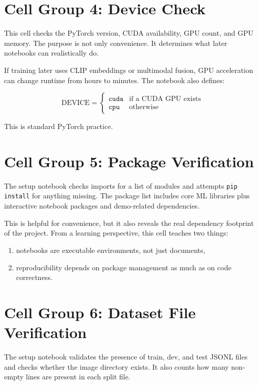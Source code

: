 \documentclass[11pt,a4paper]{report}
\begin{document}
\section{Cell Group 4: Device Check}

This cell checks the PyTorch version, CUDA availability, GPU count, and GPU memory. The purpose is not only convenience. It determines what later notebooks can realistically do.

If training later uses CLIP embeddings or multimodal fusion, GPU acceleration can change runtime from hours to minutes. The notebook also defines:

\[
\text{DEVICE} =
\begin{cases}
\texttt{cuda} & \text{if a CUDA GPU exists} \\
\texttt{cpu} & \text{otherwise}
\end{cases}
\]

This is standard PyTorch practice.

\section{Cell Group 5: Package Verification}

The setup notebook checks imports for a list of modules and attempts \texttt{pip install} for anything missing. The package list includes core ML libraries plus interactive notebook packages and demo-related dependencies.

This is helpful for convenience, but it also reveals the real dependency footprint of the project. From a learning perspective, this cell teaches two things:

\begin{enumerate}[label=\arabic*.]
\item notebooks are executable environments, not just documents,
\item reproducibility depends on package management as much as on code correctness.
\end{enumerate}

\section{Cell Group 6: Dataset File Verification}

The setup notebook validates the presence of train, dev, and test JSONL files and checks whether the image directory exists. It also counts how many non-empty lines are present in each split file.
\end{document}

